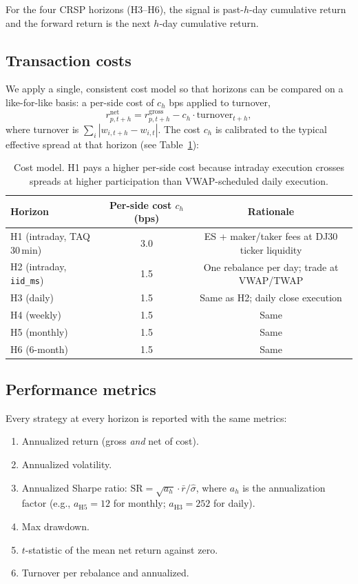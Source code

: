 \documentclass[11pt,letterpaper]{article}
\begin{document}
For the four CRSP horizons (H3--H6), the signal is past-$h$-day cumulative return and the forward return is the next $h$-day cumulative return.

\subsection{Transaction costs}

We apply a single, consistent cost model so that horizons can be compared on a like-for-like basis: a per-side cost of $c_h$ bps applied to turnover,
\begin{equation}
r^{\text{net}}_{p,t+h} = r^{\text{gross}}_{p,t+h} - c_h \cdot \text{turnover}_{t+h},
\end{equation}
where turnover is $\sum_i |w_{i,t+h} - w_{i,t}|$. The cost $c_h$ is calibrated to the typical effective spread at that horizon (see Table~\ref{tab:costs}):

\begin{table}[H]
\centering
\small
\begin{tabular}{@{}lcc@{}}
\toprule
\textbf{Horizon} & \textbf{Per-side cost $c_h$ (bps)} & \textbf{Rationale}\\
\midrule
H1 (intraday, TAQ 30\,min)      & 3.0 & ES + maker/taker fees at DJ30 ticker liquidity\\
H2 (intraday, \texttt{iid\_ms}) & 1.5 & One rebalance per day; trade at VWAP/TWAP\\
H3 (daily)                      & 1.5 & Same as H2; daily close execution\\
H4 (weekly)                     & 1.5 & Same\\
H5 (monthly)                    & 1.5 & Same\\
H6 (6-month)                    & 1.5 & Same\\
\bottomrule
\end{tabular}
\caption{Cost model. H1 pays a higher per-side cost because intraday execution crosses spreads at higher participation than VWAP-scheduled daily execution.}
\label{tab:costs}
\end{table}

\subsection{Performance metrics}

Every strategy at every horizon is reported with the same metrics:

\begin{enumerate}[leftmargin=*]
  \item Annualized return (gross \emph{and} net of cost).
  \item Annualized volatility.
  \item Annualized Sharpe ratio: $\text{SR} = \sqrt{a_h}\cdot \bar r/\hat\sigma$, where $a_h$ is the annualization factor (e.g., $a_{\text{H5}} = 12$ for monthly; $a_{\text{H3}} = 252$ for daily).
  \item Max drawdown.
  \item $t$-statistic of the mean net return against zero.
  \item Turnover per rebalance and annualized.
\end{enumerate}
\end{document}
